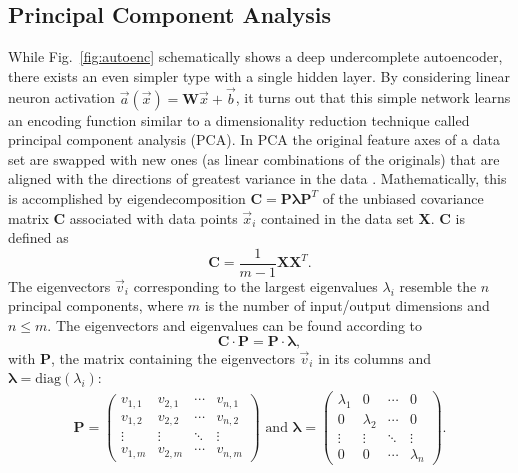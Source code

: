 \documentclass[a4paper, 12pt, twoside]{article}
\begin{document}
\begin{appendices}
	\section{Principal Component Analysis}\label{app:pca}
While Fig.~\ref{fig:autoenc} schematically shows a deep undercomplete autoencoder, there exists an even simpler type with a single hidden layer. By considering linear neuron activation $\vec{a}(\vec{x})=\textbf{W}\vec{x}+\vec{b}$, it turns out that this simple network learns an encoding function similar to a dimensionality reduction technique called principal component analysis (PCA). In PCA the original feature axes of a data set are swapped with new ones (as linear combinations of the originals) that are aligned with the directions of greatest variance in the data \cite{pca}. Mathematically, this is accomplished by eigendecomposition $\textbf{C}=\textbf{P}\bm{\lambda}\textbf{P}^T$ of the unbiased covariance matrix \textbf{C} associated with data points $\vec{x}_i$ contained in the data set \textbf{X}. \textbf{C} is defined as
\begin{equation}
	\textbf{C}= \frac{1}{m-1}\textbf{X}\textbf{X}^T.
\end{equation}
The eigenvectors $\vec{v}_i$ corresponding to the largest eigenvalues $\lambda_i$ resemble the $n$ principal components, where $m$ is the number of input/output dimensions and $n\leq m$. The eigenvectors and eigenvalues can be found according to 
\begin{equation}
	\textbf{C}\cdot\textbf{P}=\textbf{P}\cdot \bm{\lambda},
\end{equation}
with $\textbf{P}$, the matrix containing the eigenvectors $\vec{v}_i$ in its columns and $\bm{\lambda}=\text{diag}(\lambda_i)$:
\begin{gather}
	\textbf{P}=
		\begin{pmatrix} 
			v_{1,1} & v_{2,1} & \cdots & v_{n,1}\\
			v_{1,2} & v_{2,2} & \cdots & v_{n,2}\\
			\vdots  & \vdots  & \ddots & \vdots \\
			v_{1,m} & v_{2,m} & \cdots & v_{n,m}
		\end{pmatrix} \text{ and }
	\bm{\lambda}=
		\begin{pmatrix} 
			\lambda_{1} & 0 & \cdots & 0\\
			0 & \lambda_{2} & \cdots & 0\\
			\vdots  & \vdots  & \ddots & \vdots\\
			0 & 0 & \cdots & \lambda_{n}
		\end{pmatrix}.

\end{gather}
\end{appendices}
\end{document}
